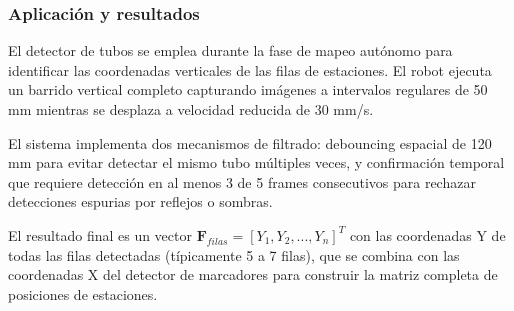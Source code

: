 \subsubsection{Aplicación y resultados}

El detector de tubos se emplea durante la fase de mapeo autónomo para identificar las coordenadas verticales de las filas de estaciones. El robot ejecuta un barrido vertical completo capturando imágenes a intervalos regulares de 50 mm mientras se desplaza a velocidad reducida de 30 mm/s.

El sistema implementa dos mecanismos de filtrado: debouncing espacial de 120 mm para evitar detectar el mismo tubo múltiples veces, y confirmación temporal que requiere detección en al menos 3 de 5 frames consecutivos para rechazar detecciones espurias por reflejos o sombras.

El resultado final es un vector $\mathbf{F}_{filas} = [Y_1, Y_2, ..., Y_n]^T$ con las coordenadas Y de todas las filas detectadas (típicamente 5 a 7 filas), que se combina con las coordenadas X del detector de marcadores para construir la matriz completa de posiciones de estaciones.